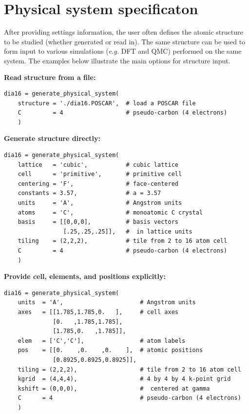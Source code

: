 \documentclass[oneside,11pt]{memoir}
\numberwithin{equation}{section}
\begin{document}
\section{Physical system specificaton}\label{sec:user_system}
After providing settings information, the user often defines the atomic structure to be studied (whether generated or read in).  The same structure can be used to form input to various simulations (\emph{e.g.} DFT and QMC) performed on the same system.  The examples below illustrate the main options for structure input.
\newline

\vspace*{3mm}
\noindent
\textbf{Read structure from a file:}
\begin{verbatim}
dia16 = generate_physical_system(
    structure = './dia16.POSCAR',  # load a POSCAR file
    C         = 4                  # pseudo-carbon (4 electrons)
    )
\end{verbatim}

\noindent
\textbf{Generate structure directly:}
\begin{verbatim}
dia16 = generate_physical_system(
    lattice   = 'cubic',           # cubic lattice
    cell      = 'primitive',       # primitive cell
    centering = 'F',               # face-centered
    constants = 3.57,              # a = 3.57
    units     = 'A',               # Angstrom units
    atoms     = 'C',               # monoatomic C crystal
    basis     = [[0,0,0],          # basis vectors
                 [.25,.25,.25]],   #  in lattice units
    tiling    = (2,2,2),           # tile from 2 to 16 atom cell
    C         = 4                  # pseudo-carbon (4 electrons)
    )
\end{verbatim}

\noindent
\textbf{Provide cell, elements, and positions explicitly:}
\begin{verbatim}
dia16 = generate_physical_system(
    units  = 'A',                      # Angstrom units
    axes   = [[1.785,1.785,0.   ],     # cell axes
              [0.   ,1.785,1.785],
              [1.785,0.   ,1.785]],
    elem   = ['C','C'],                # atom labels
    pos    = [[0.    ,0.    ,0.    ],  # atomic positions
              [0.8925,0.8925,0.8925]],
    tiling = (2,2,2),                  # tile from 2 to 16 atom cell
    kgrid  = (4,4,4),                  # 4 by 4 by 4 k-point grid
    kshift = (0,0,0),                  #  centered at gamma
    C      = 4                         # pseudo-carbon (4 electrons)
    )
\end{verbatim}
\end{document}
